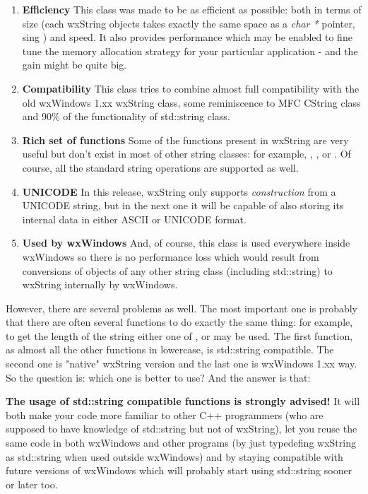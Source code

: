 \begin{enumerate}\itemsep=0pt
\item {\bf Efficiency} This class was made to be as efficient as possible: both
in terms of size (each wxString objects takes exactly the same space as a {\it
char *} pointer, sing ) and speed.
It also provides performance  
which may be enabled to fine tune the memory allocation strategy for your
particular application - and the gain might be quite big.
\item {\bf Compatibility} This class tries to combine almost full compatibility
with the old wxWindows 1.xx wxString class, some reminiscence to MFC CString
class and 90\% of the functionality of std::string class.
\item {\bf Rich set of functions} Some of the functions present in wxString are
very useful but don't exist in most of other string classes: for example, 
, 
,  
or . Of course, all the standard string
operations are supported as well.
\item {\bf UNICODE} In this release, wxString only supports {\it construction} from
a UNICODE string, but in the next one it will be capable of also storing its
internal data in either ASCII or UNICODE format.
\item {\bf Used by wxWindows} And, of course, this class is used everywhere
inside wxWindows so there is no performance loss which would result from
conversions of objects of any other string class (including std::string) to
wxString internally by wxWindows.
\end{enumerate}

However, there are several problems as well. The most important one is probably
that there are often several functions to do exactly the same thing: for
example, to get the length of the string either one of 
,  or 
 may be used. The first function, as almost
all the other functions in lowercase, is std::string compatible. The second one
is "native" wxString version and the last one is wxWindows 1.xx way. So the
question is: which one is better to use? And the answer is that:

{\bf The usage of std::string compatible functions is strongly advised!} It will
both make your code more familiar to other C++ programmers (who are supposed to
have knowledge of std::string but not of wxString), let you reuse the same code
in both wxWindows and other programs (by just typedefing wxString as std::string
when used outside wxWindows) and by staying compatible with future versions of
wxWindows which will probably start using std::string sooner or later too.

